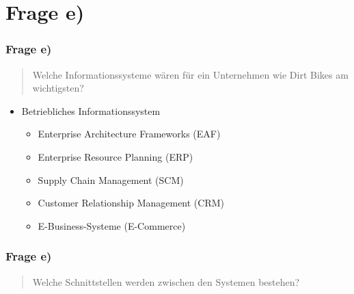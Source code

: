 \documentclass{beamer}
\begin{document}
\section{Frage e)}
\begin{frame}
\frametitle{Frage e)}

\begin{quote}
Welche Informationssysteme wären für ein Unternehmen wie Dirt Bikes am wichtigsten?
\end{quote}

\begin{itemize}
\item Betriebliches Informationssystem
\begin{itemize}
\setlength{\itemsep}{10pt}
\item Enterprise Architecture Frameworks (EAF)
\item Enterprise Resource Planning (ERP)
\item Supply Chain Management (SCM)
\item Customer Relationship Management (CRM)
\item E-Business-Systeme (E-Commerce)
\end{itemize}
\end{itemize}

\end{frame}

\begin{frame}
\frametitle{Frage e)}

\begin{quote}
Welche Schnittstellen werden zwischen den Systemen bestehen?
\end{quote}

\centering
{}

\end{frame}
\end{document}

